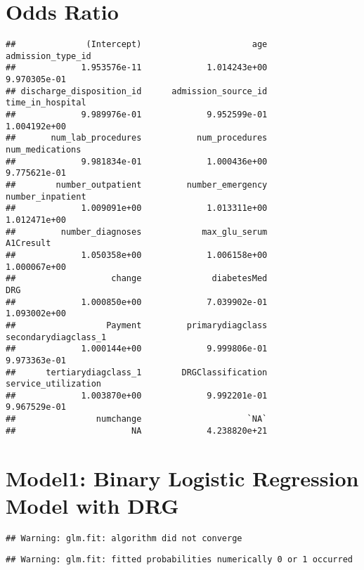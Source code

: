\documentclass[11pt,]{article}
\begin{document}
\section{Odds Ratio}\label{odds-ratio}

\begin{verbatim}
##              (Intercept)                      age        admission_type_id 
##             1.953576e-11             1.014243e+00             9.970305e-01 
## discharge_disposition_id      admission_source_id         time_in_hospital 
##             9.989976e-01             9.952599e-01             1.004192e+00 
##       num_lab_procedures           num_procedures          num_medications 
##             9.981834e-01             1.000436e+00             9.775621e-01 
##        number_outpatient         number_emergency         number_inpatient 
##             1.009091e+00             1.013311e+00             1.012471e+00 
##         number_diagnoses            max_glu_serum                A1Cresult 
##             1.050358e+00             1.006158e+00             1.000067e+00 
##                   change              diabetesMed                      DRG 
##             1.000850e+00             7.039902e-01             1.093002e+00 
##                  Payment         primarydiagclass     secondarydiagclass_1 
##             1.000144e+00             9.999806e-01             9.973363e-01 
##      tertiarydiagclass_1        DRGClassification      service_utilization 
##             1.003870e+00             9.992201e-01             9.967529e-01 
##                numchange                     `NA` 
##                       NA             4.238820e+21
\end{verbatim}

\section{Model1: Binary Logistic Regression Model with
DRG}\label{model1-binary-logistic-regression-model-with-drg}

\begin{verbatim}
## Warning: glm.fit: algorithm did not converge
\end{verbatim}

\begin{verbatim}
## Warning: glm.fit: fitted probabilities numerically 0 or 1 occurred
\end{verbatim}
\end{document}

